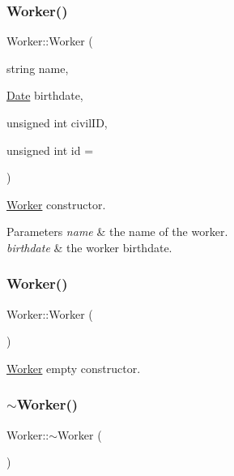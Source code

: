 \subsubsection{\texorpdfstring{Worker()}{Worker()}\hspace{0.1cm}{\footnotesize\ttfamily [1/2]}}
{\footnotesize\ttfamily Worker\+::\+Worker (\begin{DoxyParamCaption}\item[{string}]{name,  }\item[{\hyperlink{class_date}{Date}}]{birthdate,  }\item[{unsigned int}]{civil\+ID,  }\item[{unsigned int}]{id = {} }\end{DoxyParamCaption})}



\hyperlink{class_worker}{Worker} constructor. 


\begin{DoxyParams}{Parameters}
{\em name} & the name of the worker. \\
\hline
{\em birthdate} & the worker birthdate. \\
\hline
\end{DoxyParams}
\hypertarget{class_worker_a3754817df06ffe220f7f0d903c78ccac}{}\label{class_worker_a3754817df06ffe220f7f0d903c78ccac} 
\subsubsection{\texorpdfstring{Worker()}{Worker()}\hspace{0.1cm}{\footnotesize\ttfamily [2/2]}}
{\footnotesize\ttfamily Worker\+::\+Worker (\begin{DoxyParamCaption}{ }\end{DoxyParamCaption})}



\hyperlink{class_worker}{Worker} empty constructor. 

\hypertarget{class_worker_aa8e4543ef1e93fd9d884269ba30c5bfe}{}\label{class_worker_aa8e4543ef1e93fd9d884269ba30c5bfe} 
\subsubsection{\texorpdfstring{$\sim$\+Worker()}{~Worker()}}
{\footnotesize\ttfamily Worker\+::$\sim$\+Worker (\begin{DoxyParamCaption}{ }\end{DoxyParamCaption})}



